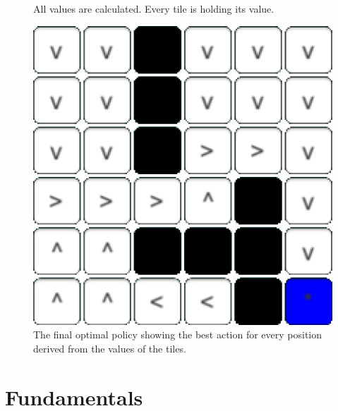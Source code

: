 \documentclass[conference]{IEEEtran}
\begin{document}
\begin{figure}[h]
\begin{minipage}[t]{0.3\linewidth}
\caption{All values are calculated. Every tile is holding its value.}
\end{minipage}
\hfill
\begin{minipage}[t]{0.3\linewidth}
\centering
\includegraphics[width=1\textwidth]{images/intro/policy.png}
\caption{The final optimal policy showing the best action for every position derived from the values of the tiles.}
\end{minipage}
\end{figure}


\section{Fundamentals}
\end{document}
